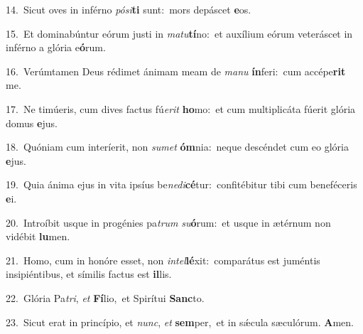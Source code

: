 {\numbfont\textcolor{\numbcolor}{14.}}~Sicut oves in inférno \textit{pó}\-\textit{si}\textbf{ti} sunt:~\star mors depáscet \textbf{e}\-os.\par
{\numbfont\textcolor{\numbcolor}{15.}}~Et dominabúntur eórum justi in \textit{ma}\-\textit{tu}\textbf{tí}no:~\star et auxílium eórum veteráscet in inférno a glória e\-\textbf{ó}\-rum.\par
{\numbfont\textcolor{\numbcolor}{16.}}~Verúmtamen Deus rédimet ánimam meam de \textit{ma}\-\textit{nu} \textbf{ín}\-feri:~\star cum accépe\textbf{rit} me.\par
{\numbfont\textcolor{\numbcolor}{17.}}~Ne timúeris, cum dives factus fú\-\textit{e}\-\textit{rit} \textbf{ho}\-mo:~\star et cum multiplicáta fúerit glória domus \textbf{e}\-jus.\par
{\numbfont\textcolor{\numbcolor}{18.}}~Quóniam cum interíerit, non \textit{su}\-\textit{met} \textbf{óm}\-nia:~\star neque descéndet cum eo glória \textbf{e}\-jus.\par
{\numbfont\textcolor{\numbcolor}{19.}}~Quia ánima ejus in vita ipsíus be\-\textit{ne}\-\textit{di}\textbf{cé}tur:~\star confitébitur tibi cum beneféceris \textbf{e}\-i.\par
{\numbfont\textcolor{\numbcolor}{20.}}~Introíbit usque in progénies pa\textit{trum} \textit{su}\-\textbf{ó}rum:~\star et usque in ætérnum non vidébit \textbf{lu}\-men.\par
{\numbfont\textcolor{\numbcolor}{21.}}~Homo, cum in honóre esset, non \textit{in}\-\textit{tel}\textbf{lé}xit:~\star comparátus est juméntis insipiéntibus, et símilis factus est \textbf{il}\-lis.\par
{\numbfont\textcolor{\numbcolor}{22.}}~Glória Pa\-\textit{tri}\-, \textit{et} \textbf{Fí}\-lio,~\star et Spirítui \textbf{Sanc}\-to.\par
{\numbfont\textcolor{\numbcolor}{23.}}~Sicut erat in princípio, et \textit{nunc}\-, \textit{et} \textbf{sem}\-per,~\star et in sǽcula sæculórum. \textbf{A}\-men.\par
